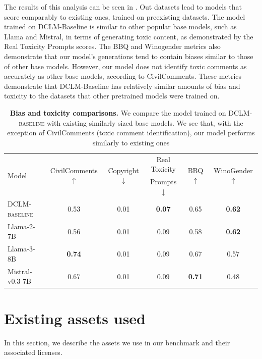 \documentclass{article}
\newcommand{\hqpool}{\textsc{DCLM-baseline}\xspace}
\begin{document}
The results of this analysis can be seen in .
Out datasets lead to models that score comparably to existing ones, trained on preexisting datasets.
The model trained on DCLM-Baseline is similar to other popular base models, such as Llama and Mistral, in terms of generating toxic content, as demonstrated by the Real Toxicity Prompts scores.
The BBQ and Winogender metrics also demonstrate that our model’s generations tend to contain biases similar to those of other base models.
However, our model does not identify toxic comments as accurately as other base models, according to CivilComments.
These metrics demonstrate that DCLM-Baseline has relatively similar amounts of bias and toxicity to the datasets that other pretrained models were trained on.

\begin{table}[t]
\centering
\small
\begin{tabular}{lccccc}
\toprule
\multirow{2}{*}{Model} & \multirow{2}{*}{CivilComments $\uparrow$} & \multirow{2}{*}{Copyright $\downarrow$} & Real Toxicity & \multirow{2}{*}{BBQ $\uparrow$} & \multirow{2}{*}{WinoGender $\uparrow$}\\
& & & Prompts $\downarrow$ & & \\
\midrule
\hqpool & 0.53 & 0.01 & \textbf{0.07} & 0.65 & \textbf{0.62} \\
Llama-2-7B & 0.56 & 0.01 & 0.09 & 0.58 & \textbf{0.62} \\
Llama-3-8B & \textbf{0.74} & 0.01 & 0.09 & 0.67 & 0.57 \\
Mistral-v0.3-7B & 0.67 & 0.01 & 0.09 & \textbf{0.71} & 0.48 \\
\bottomrule
\end{tabular}
\caption{\textbf{Bias and toxicity comparisons.} We compare the model trained on \hqpool with existing similarly sized base models. We see that, with the exception of CivilComments (toxic comment identification), our model performs similarly to existing ones}
\label{tab:toxicity_analysis}
\end{table}

\section{Existing assets used}\label{appx:existing-assets}
In this section, we describe the assets we use in our benchmark and their associated licenses.
\end{document}
